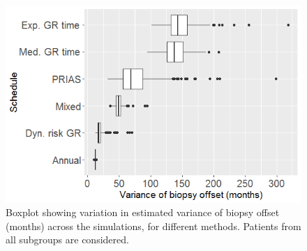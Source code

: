 \begin{figure}[!htb]
\centerline{\includegraphics[width=\columnwidth]{images/sim_study/offsetVarBoxPlot_all.png}}
\caption{Boxplot showing variation in estimated variance of biopsy offset (months) across the simulations, for different methods. Patients from all subgroups are considered.}
\label{fig : offsetVarBoxPlot_all}
\end{figure}



